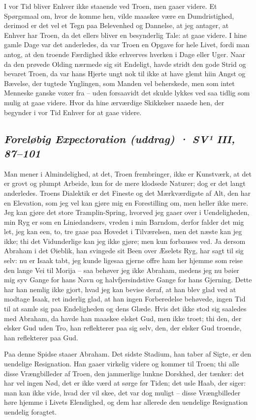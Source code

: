 \documentclass[12pt,a4paper]{article}
\newcommand{\sectionheading}[1]{\subsection*{\normalfont\itshape #1}}
\begin{document}
I vor Tid bliver Enhver ikke staaende ved Troen, men gaaer videre. Et Spørgsmaal om, hvor de komme hen, vilde maaskee være en Dumdristighed, derimod er det vel et Tegn paa Belevenhed og Dannelse, at jeg antager, at Enhver har Troen, da det ellers bliver en besynderlig Tale: at gaae videre. I hine gamle Dage var det anderledes, da var Troen en Opgave for hele Livet, fordi man antog, at den troende Færdighed ikke erhverves hverken i Dage eller Uger. Naar da den prøvede Olding nærmede sig sit Endeligt, havde stridt den gode Strid og bevaret Troen, da var hans Hjerte ungt nok til ikke at have glemt hiin Angst og Bævelse, der tugtede Ynglingen, som Manden vel beherskede, men som intet Menneske ganske voxer fra – uden forsaavidt det skulde lykkes ved saa tidlig som mulig at gaae videre. Hvor da hine ærværdige Skikkelser naaede hen, der begynder i vor Tid Enhver for at gaae videre.

\sectionheading{Foreløbig Expectoration (uddrag)  ·  SV¹ III, 87–101}

Man mener i Almindelighed, at det, Troen frembringer, ikke er Kunstværk, at det er grovt og plumpt Arbeide, kun for de mere klodsede Naturer; dog er det langt anderledes. Troens Dialektik er det Fineste og det Mærkværdigste af Alt, den har en Elevation, som jeg vel kan gjøre mig en Forestilling om, men heller ikke mere. Jeg kan gjøre det store Tramplin-Spring, hvorved jeg gaaer over i Uendeligheden, min Ryg er som en Liniedandsers, vreden i min Barndom, derfor falder det mig let, jeg kan een, to, tre gaae paa Hovedet i Tilværelsen, men det næste kan jeg ikke; thi det Vidunderlige kan jeg ikke gjøre; men kun forbauses ved. Ja dersom Abraham i det Øieblik, han svingede sit Been over Æselets Ryg, har sagt til sig selv: nu er Isaak tabt, jeg kunde ligesaa gjerne offre ham her hjemme som reise den lange Vei til Morija – saa behøver jeg ikke Abraham, medens jeg nu bøier mig syv Gange for hans Navn og halvfjersindstive Gange for hans Gjerning. Dette har han nemlig ikke gjort, hvad jeg kan bevise deraf, at han blev glad ved at modtage Isaak, ret inderlig glad, at han ingen Forberedelse behøvede, ingen Tid til at samle sig paa Endeligheden og dens Glæde. Hvis det ikke stod sig saaledes med Abraham, da havde han maaskee elsket Gud, men ikke troet; thi den, der elsker Gud uden Tro, han reflekterer paa sig selv, den, der elsker Gud troende, han reflekterer paa Gud.

Paa denne Spidse staaer Abraham. Det sidste Stadium, han taber af Sigte, er den uendelige Resignation. Han gaaer virkelig videre og kommer til Troen; thi alle disse Vrængbilleder af Troen, den jammerlige lunkne Dorskhed, der tænker: det har vel ingen Nød, det er ikke værd at sørge før Tiden; det usle Haab, der siger: man kan ikke vide, hvad der vil skee, det var dog muligt – disse Vrængbilleder høre hjemme i Livets Elendighed, og dem har allerede den uendelige Resignation uendelig foragtet.
\end{document}
